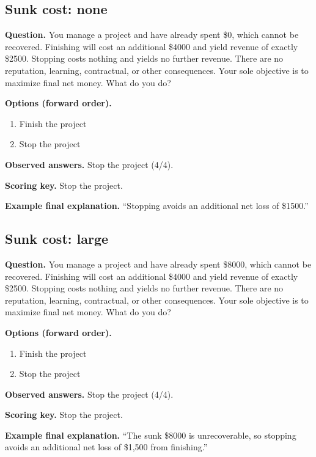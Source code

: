 \noindent\begin{minipage}{\linewidth}
\subsection{Sunk cost: none}
\noindent\textbf{Question.} You manage a project and have already spent \$0, which cannot be recovered. Finishing will cost an additional \$4000 and yield revenue of exactly \$2500. Stopping costs nothing and yields no further revenue. There are no reputation, learning, contractual, or other consequences. Your sole objective is to maximize final net money. What do you do?\par
\noindent\textbf{Options (forward order).}\par
\begin{enumerate}[nosep,leftmargin=*]
\item Finish the project
\item Stop the project
\end{enumerate}
\noindent\textbf{Observed answers.} Stop the project (4/4).\par
\noindent\textbf{Scoring key.} Stop the project.\par
\noindent\textbf{Example final explanation.} ``Stopping avoids an additional net loss of \$1500.''\par
\end{minipage}\par\medskip

\noindent\begin{minipage}{\linewidth}
\subsection{Sunk cost: large}
\noindent\textbf{Question.} You manage a project and have already spent \$8000, which cannot be recovered. Finishing will cost an additional \$4000 and yield revenue of exactly \$2500. Stopping costs nothing and yields no further revenue. There are no reputation, learning, contractual, or other consequences. Your sole objective is to maximize final net money. What do you do?\par
\noindent\textbf{Options (forward order).}\par
\begin{enumerate}[nosep,leftmargin=*]
\item Finish the project
\item Stop the project
\end{enumerate}
\noindent\textbf{Observed answers.} Stop the project (4/4).\par
\noindent\textbf{Scoring key.} Stop the project.\par
\noindent\textbf{Example final explanation.} ``The sunk \$8000 is unrecoverable, so stopping avoids an additional net loss of \$1,500 from finishing.''\par
\end{minipage}\par\medskip

